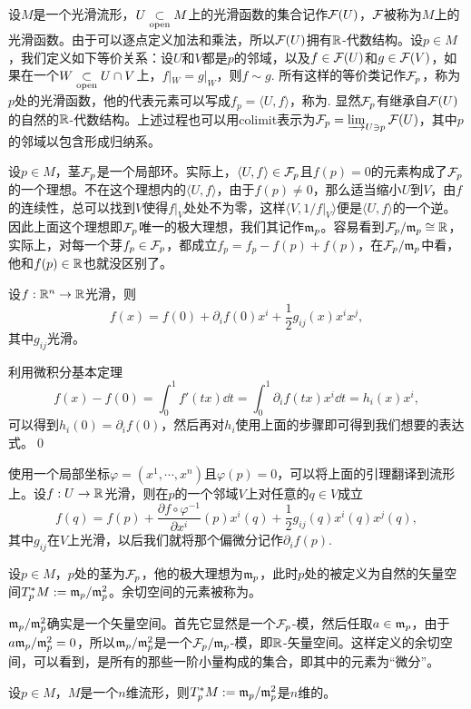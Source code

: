 \para 设$M$是一个光滑流形，$U\underset{\mathrm{open}}{\subset} M$上的光滑函数的集合记作$\mathcal{F}(U)$，$\mathcal{F}$被称为$M$上的光滑函数。由于可以逐点定义加法和乘法，所以$\mathcal{F}(U)$拥有$\mathbb{R}$-代数结构。设$p\in M$，我们定义如下等价关系：设$U$和$V$都是$p$的邻域，以及$f\in \mathcal{F}(U)$和$g\in \mathcal{F}(V)$，如果在一个$W\underset{\mathrm{open}}{\subset} U\cap V$上，$f|_W=g|_W$，则$f\sim g$. 所有这样的等价类记作$\mathcal{F}_p$，称为$p$处的光滑函数，他的代表元素可以写成$f_p=\langle U,f\rangle$，称为. 显然$\mathcal{F}_p$有继承自$\mathcal{F}(U)$的自然的$\mathbb{R}$-代数结构。上述过程也可以用colimit表示为$\mathcal{F}_p=\varinjlim_{U\ni p}\mathcal{F}(U)$，其中$p$的邻域以包含形成归纳系。

设$p\in M$，茎$\mathcal{F}_p$是一个局部环。实际上，$\langle U,f\rangle \in \mathcal{F}_p$且$f(p)= 0$的元素构成了$\mathcal{F}_p$的一个理想。不在这个理想内的$\langle U,f\rangle$，由于$f(p)\neq 0$，那么适当缩小$U$到$V$，由$f$的连续性，总可以找到$V$使得$f|_V$处处不为零，这样$\langle V,1/f|_V\rangle$便是$\langle U,f\rangle$的一个逆。因此上面这个理想即$\mathcal{F}_p$唯一的极大理想，我们其记作$\mathfrak{m}_p$。容易看到$\mathcal{F}_p/\mathfrak{m}_p\cong \mathbb{R}$，实际上，对每一个芽$f_p\in\mathcal{F}_p$，都成立$f_p=f_p-f(p)+f(p)$，在$\mathcal{F}_p/\mathfrak{m}_p$中看，他和$f(p)\in\mathbb{R}$也就没区别了。

\lem 设$f:\mathbb{R}^n\to \mathbb{R}$光滑，则
\[
	f(x)=f(0)+\partial_if(0)x^i+\frac{1}{2}g_{ij}(x)x^ix^j,
\]
其中$g_{ij}$光滑。

\proof 利用微积分基本定理
\[
	f(x)-f(0)=\int_0^1f'(tx)\dd t=\int_0^1\partial_i f(tx)x^i\dd t=h_i(x)x^i,
\]
可以得到$h_i(0)=\partial_i f(0)$，然后再对$h_i$使用上面的步骤即可得到我们想要的表达式。\qed

\para 使用一个局部坐标$\varphi=(x^1,\cdots,x^n)$且$\varphi(p)=0$，可以将上面的引理翻译到流形上。设$f:U\to \mathbb{R}$光滑，则在$p$的一个邻域$V$上对任意的$q\in V$成立
\[
	f(q)=f(p)+\frac{\partial f\circ \varphi^{-1}}{\partial x^i}(p)x^i(q)+\frac{1}{2}g_{ij}(q)x^i(q)x^j(q),
\]
其中$g_{ij}$在$V$上光滑，以后我们就将那个偏微分记作$\partial_i f(p)$.


\para 设$p\in M$，$p$处的茎为$\mathcal{F}_p$，他的极大理想为$\mathfrak{m}_p$，此时$p$处的被定义为自然的矢量空间$T_p^*M:=\mathfrak{m}_p/\mathfrak{m}_p^2$。余切空间的元素被称为。

$\mathfrak{m}_p/\mathfrak{m}_p^2$确实是一个矢量空间。首先它显然是一个$\mathcal{F}_p$-模，然后任取$a\in \mathfrak{m}_p$，由于$a\mathfrak{m}_p/\mathfrak{m}_p^2=0$，所以$\mathfrak{m}_p/\mathfrak{m}_p^2$是一个$\mathcal{F}_p/\mathfrak{m}_p$-模，即$\mathbb{R}$-矢量空间。这样定义的余切空间，可以看到，是所有的那些一阶小量构成的集合，即其中的元素为“{微分\kaishu}”。

\para 设$p\in M$，$M$是一个$n$维流形，则$T_p^*M:=\mathfrak{m}_p/\mathfrak{m}_p^2$是$n$维的。

